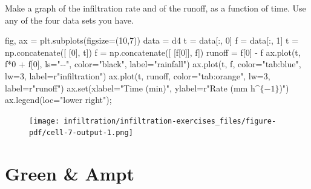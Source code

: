 \documentclass[
  letterpaper,
  DIV=11,
  numbers=noendperiod]{scrreprt}
\newenvironment{Shaded}{\begin{snugshade}}{\end{snugshade}}
\newcommand{\BuiltInTok}[1]{\textcolor[rgb]{0.00,0.23,0.31}{#1}}
\newcommand{\DecValTok}[1]{\textcolor[rgb]{0.68,0.00,0.00}{#1}}
\newcommand{\NormalTok}[1]{\textcolor[rgb]{0.00,0.23,0.31}{#1}}
\newcommand{\OperatorTok}[1]{\textcolor[rgb]{0.37,0.37,0.37}{#1}}
\newcommand{\StringTok}[1]{\textcolor[rgb]{0.13,0.47,0.30}{#1}}
\newcommand{\VerbatimStringTok}[1]{\textcolor[rgb]{0.13,0.47,0.30}{#1}}
\begin{document}
Make a graph of the infiltration rate and of the runoff, as a function
of time. Use any of the four data sets you have.

\begin{Shaded}
\begin{Highlighting}[]
\NormalTok{fig, ax }\OperatorTok{=}\NormalTok{ plt.subplots(figsize}\OperatorTok{=}\NormalTok{(}\DecValTok{10}\NormalTok{,}\DecValTok{7}\NormalTok{))}
\NormalTok{data }\OperatorTok{=}\NormalTok{ d4}
\NormalTok{t }\OperatorTok{=}\NormalTok{ data[:, }\DecValTok{0}\NormalTok{]}
\NormalTok{f }\OperatorTok{=}\NormalTok{ data[:, }\DecValTok{1}\NormalTok{]}
\NormalTok{t }\OperatorTok{=}\NormalTok{ np.concatenate([ [}\DecValTok{0}\NormalTok{], t])}
\NormalTok{f }\OperatorTok{=}\NormalTok{ np.concatenate([ [f[}\DecValTok{0}\NormalTok{]], f])}
\NormalTok{runoff }\OperatorTok{=}\NormalTok{ f[}\DecValTok{0}\NormalTok{] }\OperatorTok{{-}}\NormalTok{ f}
\NormalTok{ax.plot(t, f}\OperatorTok{*}\DecValTok{0} \OperatorTok{+}\NormalTok{ f[}\DecValTok{0}\NormalTok{], ls}\OperatorTok{=}\StringTok{"{-}{-}"}\NormalTok{, color}\OperatorTok{=}\StringTok{"black"}\NormalTok{, label}\OperatorTok{=}\StringTok{"rainfall"}\NormalTok{)}
\NormalTok{ax.plot(t, f, color}\OperatorTok{=}\StringTok{"tab:blue"}\NormalTok{, lw}\OperatorTok{=}\DecValTok{3}\NormalTok{, label}\OperatorTok{=}\VerbatimStringTok{r"infiltration"}\NormalTok{)}
\NormalTok{ax.plot(t, runoff, color}\OperatorTok{=}\StringTok{"tab:orange"}\NormalTok{, lw}\OperatorTok{=}\DecValTok{3}\NormalTok{, label}\OperatorTok{=}\VerbatimStringTok{r"runoff"}\NormalTok{)}
\NormalTok{ax.}\BuiltInTok{set}\NormalTok{(xlabel}\OperatorTok{=}\StringTok{"Time (min)"}\NormalTok{,}
\NormalTok{       ylabel}\OperatorTok{=}\VerbatimStringTok{r"Rate (mm h$\^{}\{{-}1\}$)"}\NormalTok{)}
\NormalTok{ax.legend(loc}\OperatorTok{=}\StringTok{"lower right"}\NormalTok{)}\OperatorTok{;}
\end{Highlighting}
\end{Shaded}

\begin{figure}[H]

{\centering \texttt{[image: infiltration/infiltration-exercises\_files/figure-pdf/cell-7-output-1.png]}

}

\end{figure}

\hypertarget{green-ampt-1}{%
\section{Green \& Ampt}\label{green-ampt-1}}
\end{document}
